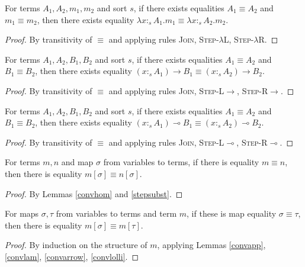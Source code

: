 \documentclass[sigplan,screen,review,anonymous]{acmart}
\newcommand{\rname}[1]{\textsc{\footnotesize #1}}
\newcommand{\stype}[1]{:_#1}
\begin{document}
\begin{lemma}\label{convlam}
  For terms $A_1, A_2, m_1, m_2$ and sort $s$, if there exists equalities $A_1 \equiv A_2$ and $m_1 \equiv m_2$, then there exists equality $\lambda x \stype{s} A_1.m_1 \equiv \lambda x \stype{s} A_2.m_2$.
\end{lemma}
\begin{proof}
  By transitivity of $\equiv$ and applying rules \rname{Join}, \rname{Step-$\lambda$L}, \rname{Step-$\lambda$R}.
\end{proof}

\begin{lemma}\label{convarrow}
  For terms $A_1, A_2, B_1, B_2$ and sort $s$, if there exists equalities $A_1 \equiv A_2$ and $B_1 \equiv B_2$, then there exists equality $(x \stype{s} A_1) \rightarrow B_1 \equiv (x \stype{s} A_2) \rightarrow B_2$.
\end{lemma}
\begin{proof}
  By transitivity of $\equiv$ and applying rules \rname{Join}, \rname{Step-L$\rightarrow$}, \rname{Step-R$\rightarrow$}.
\end{proof}

\begin{lemma}\label{convlolli}
  For terms $A_1, A_2, B_1, B_2$ and sort $s$, if there exists equalities $A_1 \equiv A_2$ and $B_1 \equiv B_2$, then there exists equality $(x \stype{s} A_1) \multimap B_1 \equiv (x \stype{s} A_2) \multimap B_2$.
\end{lemma}
\begin{proof}
  By transitivity of $\equiv$ and applying rules \rname{Join}, \rname{Step-L$\multimap$}, \rname{Step-R$\multimap$}.
\end{proof}

\begin{lemma}\label{convsubst}
  For terms $m, n$ and map $\sigma$ from variables to terms, if there is equality $m \equiv n$, then there is equality $m[\sigma] \equiv n[\sigma]$.
\end{lemma}
\begin{proof}
  By Lemmas \ref{convhom} and \ref{stepsubst}.
\end{proof}

\begin{lemma}\label{convcompat}
  For maps $\sigma, \tau$ from variables to terms and term $m$, if these is map equality $\sigma \equiv \tau$, then there is equality $m[\sigma] \equiv m[\tau]$.
\end{lemma}
\begin{proof}
  By induction on the structure of $m$, applying Lemmas \ref{convapp}, \ref{convlam}, \ref{convarrow}, \ref{convlolli}.
\end{proof}
\end{document}
